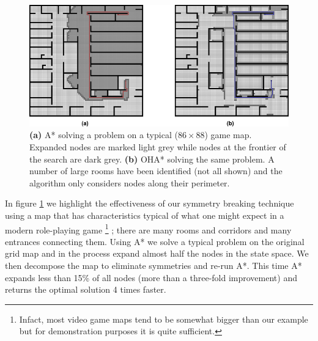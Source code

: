 \begin{figure}[t]
	\label{fig-contrast}
	\vspace{-4pt}
       \begin{center}
           \includegraphics[scale=0.50, trim = 10mm 10mm 10mm 0mm]{diagrams/oha_contrast.png}
       \end{center}
	\vspace{-3pt}
       \caption{\textbf{(a)} A* solving a problem on a typical ($86\times88$) game map. 
Expanded nodes are marked light grey while nodes at the frontier of the search are dark grey.
\textbf{(b)} OHA* solving the same problem. A number of large rooms have been identified (not
all shown) and the algorithm only considers nodes along their perimeter.}
	\vspace{-15pt}
\end{figure}

In figure \ref{fig-contrast} we highlight the effectiveness of our symmetry breaking technique using
a map that has characteristics typical of what one might expect in a modern role-playing game \footnote{
Infact, most video game maps tend to be somewhat bigger than our example but for demonstration 
purposes it is quite sufficient.}
; there are many rooms and corridors and many entrances connecting them.
Using A* we solve a typical problem on the original grid map and in the process expand almost half the nodes
in the state space.
We then decompose the map to eliminate symmetries and re-run A*.
This time A* expands less than 15\% of all nodes (more than a three-fold improvement) and returns the 
optimal solution 4 times faster.
